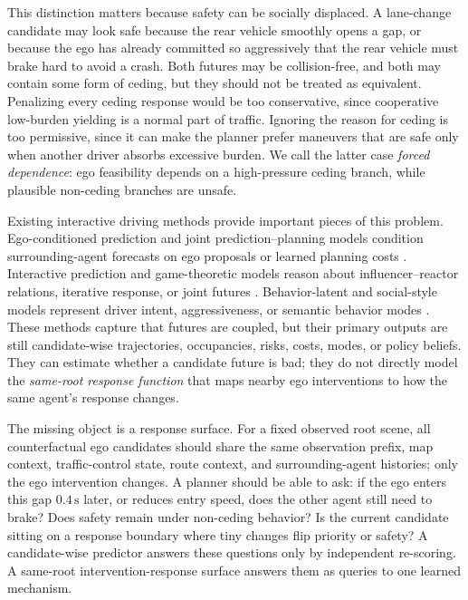 \documentclass[10pt]{article}
\begin{document}
This distinction matters because safety can be socially displaced. A lane-change candidate may look safe because the rear vehicle smoothly opens a gap, or because the ego has already committed so aggressively that the rear vehicle must brake hard to avoid a crash. Both futures may be collision-free, and both may contain some form of ceding, but they should not be treated as equivalent. Penalizing every ceding response would be too conservative, since cooperative low-burden yielding is a normal part of traffic. Ignoring the reason for ceding is too permissive, since it can make the planner prefer maneuvers that are safe only when another driver absorbs excessive burden. We call the latter case \emph{forced dependence}: ego feasibility depends on a high-pressure ceding branch, while plausible non-ceding branches are unsafe.

Existing interactive driving methods provide important pieces of this problem. Ego-conditioned prediction and joint prediction--planning models condition surrounding-agent forecasts on ego proposals or learned planning costs \parencite{song2020pip,huang2024dtpp,chen2024ppad,yu2025hype}. Interactive prediction and game-theoretic models reason about influencer--reactor relations, iterative response, or joint futures \parencite{sun2022m2i,huang2023gameformer}. Behavior-latent and social-style models represent driver intent, aggressiveness, or semantic behavior modes \parencite{hu2023formulating,chen2025categorical,deng2025social,zheng2025world4drive}. These methods capture that futures are coupled, but their primary outputs are still candidate-wise trajectories, occupancies, risks, costs, modes, or policy beliefs. They can estimate whether a candidate future is bad; they do not directly model the \emph{same-root response function} that maps nearby ego interventions to how the same agent's response changes.

The missing object is a response surface. For a fixed observed root scene, all counterfactual ego candidates should share the same observation prefix, map context, traffic-control state, route context, and surrounding-agent histories; only the ego intervention changes. A planner should be able to ask: if the ego enters this gap \(0.4\,\mathrm{s}\) later, or reduces entry speed, does the other agent still need to brake? Does safety remain under non-ceding behavior? Is the current candidate sitting on a response boundary where tiny changes flip priority or safety? A candidate-wise predictor answers these questions only by independent re-scoring. A same-root intervention-response surface answers them as queries to one learned mechanism.
\end{document}
